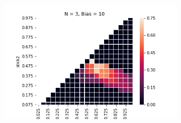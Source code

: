 \documentclass[10pt,letterpaper]{article}
\begin{document}
\begin{figure}[h]
~
\begin{subfigure}{0.3\linewidth}
	\includegraphics[width=\linewidth]{figures/nSticks3bias10.png}
\end{subfigure}


\end{figure}
\end{document}
